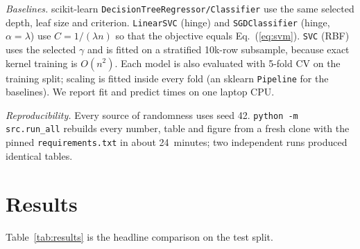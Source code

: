 \documentclass[10pt,twocolumn,a4paper]{article}
\begin{document}
\emph{Baselines.} scikit-learn \texttt{DecisionTreeRegressor/Classifier}
use the same selected depth, leaf size and criterion. \texttt{LinearSVC}
(hinge) and \texttt{SGDClassifier} (hinge, $\alpha=\lambda$) use
$C=1/(\lambda n)$ so that the objective equals Eq.~(\ref{eq:svm}).
\texttt{SVC} (RBF) uses the selected $\gamma$ and is fitted on a
stratified 10k-row subsample, because exact kernel training is
$O(n^{2})$. Each model is also evaluated with 5-fold CV on the training
split; scaling is fitted inside every fold (an sklearn \texttt{Pipeline}
for the baselines). We report fit and predict times on one laptop CPU.

\emph{Reproducibility.} Every source of randomness uses seed 42.
\texttt{python -m src.run\_all} rebuilds every number, table and figure
from a fresh clone with the pinned \texttt{requirements.txt} in about
24~minutes; two independent runs produced identical tables.

\section{Results}
Table~\ref{tab:results} is the headline comparison on the test split.
\end{document}
